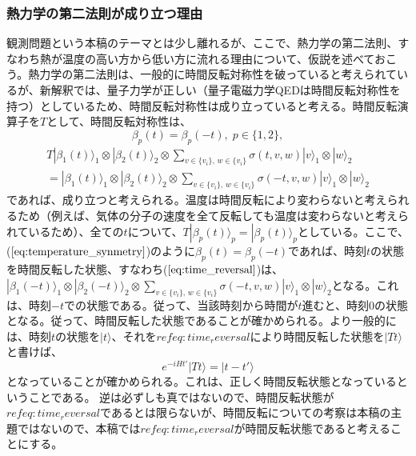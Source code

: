 \subsubsection{熱力学の第二法則が成り立つ理由}
観測問題という本稿のテーマとは少し離れるが、ここで、熱力学の第二法則、すなわち熱が温度の高い方から低い方に流れる理由について、仮説を述べておこう。熱力学の第二法則は、一般的に時間反転対称性を破っていると考えられているが、新解釈では、量子力学が正しい（量子電磁力学QEDは時間反転対称性を持つ）としているため、時間反転対称性は成り立っていると考える。時間反転演算子を$T$として、時間反転対称性は、
\begin{equation}
\label{eq:temperature_synmetry}
    \beta_p(t) = \beta_p(-t), \; p \in \{1,2\},
\end{equation}
\begin{equation}
\begin{aligned}
\label{eq:time_reversal}
    T|\beta_1(t) \rangle_1 \otimes |\beta_2(t)\rangle_2 \otimes   \sum_{v \in \{v_i\} ,\, w \in \{v_i\}} \sigma(t,v,w)|v\rangle_1 \otimes |w\rangle_2 \\
    =|\beta_1(t) \rangle_1 \otimes |\beta_2(t)\rangle_2 \otimes   \sum_{v \in \{v_i\} ,\, w \in \{v_i\}} \sigma(-t,v,w)|v\rangle_1 \otimes |w\rangle_2
\end{aligned}
\end{equation}
であれば、成り立つと考えられる。温度は時間反転により変わらないと考えられるため（例えば、気体の分子の速度を全て反転しても温度は変わらないと考えられているため）、全ての$t$について、$T|\beta_p(t) \rangle_p = |\beta_p(t) \rangle_p$としている。ここで、($\ref{eq:temperature_synmetry}$)のように$\beta_p(t) = \beta_p(-t)$であれば、時刻$t$の状態を時間反転した状態、すなわち($\ref{eq:time_reversal}$)は、$|\beta_1(-t) \rangle_1 \otimes |\beta_2(-t)\rangle_2 \otimes \sum_{v \in \{v_i\} ,\, w \in \{v_i\}} \sigma(-t,v,w)|v\rangle_1 \otimes |w\rangle_2$となる。これは、時刻$-t$での状態である。従って、当該時刻から時間が$t$進むと、時刻$0$の状態となる。従って、時間反転した状態であることが確かめられる。より一般的には、時刻$t$の状態を$|t\rangle$、それを$ref{eq:time_reversal}$により時間反転した状態を$|Tt\rangle$と書けば、
\begin{equation}
    e^{-iHt'}|Tt\rangle = |t-t'\rangle
\end{equation}
となっていることが確かめられる。これは、正しく時間反転状態となっているということである。
  逆は必ずしも真ではないので、時間反転状態が$ref{eq:time_reversal}$であるとは限らないが、時間反転についての考察は本稿の主題ではないので、本稿では$ref{eq:time_reversal}$が時間反転状態であると考えることにする。
